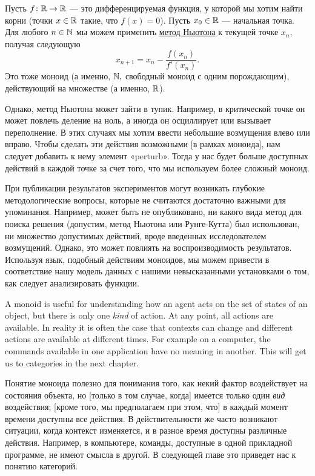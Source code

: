 \documentclass[../main/CT4S-EN-RU]{subfiles}
\begin{document}
\begin{applicationRUS}
Пусть $f\colon{\mathbb R}\rightarrow{\mathbb R}$ — это дифференцируемая функция, у которой мы хотим найти корни (точки $x\in{\mathbb R}$ такие, что $f(x)=0$). Пусть $x_0\in{\mathbb R}$ — начальная точка. Для любого $n\in{\mathbb N}$ мы можем применить \href{https://ru.wikipedia.org/wiki/%D0%9C%D0%B5%D1%82%D0%BE%D0%B4_%D0%9D%D1%8C%D1%8E%D1%82%D0%BE%D0%BD%D0%B0}{\text метод Ньютона} к текущей точке $x_n,$ получая следующую $$x_{n+1}=x_n-\frac{f(x_n)}{f'(x_n)}.$$
Это тоже моноид (а именно, ${\mathbb N},$ свободный моноид с одним порождающим), действующий на множестве (а именно, ${\mathbb R}$).

Однако, метод Ньютона может зайти в тупик. Например, в критической точке он может повлечь деление на ноль, а иногда он осциллирует или вызывает переполнение. В этих случаях мы хотим ввести небольшие возмущения влево или вправо. Чтобы сделать эти действия возможными [в рамках моноида], нам следует добавить к нему элемент «perturb». Тогда у нас будет больше доступных действий в каждой точке за счет того, что мы используем более сложный моноид.

При публикации результатов экспериментов могут возникать глубокие методологические вопросы, которые не считаются достаточно важными для упоминания. Например, может быть не опубликовано, ни какого вида метод для поиска решения (допустим, метод Ньютона или Рунге-Кутта) был использован, ни множество допустимых действий, вроде введенных исследователем возмущений. Однако, это может повлиять на воспроизводимость результатов. Используя язык, подобный действиям моноидов, мы можем привести в соответствие нашу модель данных с нашими невысказанными установками о том, как следует анализировать функции.
\end{applicationRUS}

\begin{remarkENG}
A monoid is useful for understanding how an agent acts on the set of states of an object, but there is only one {\em kind} of action. At any point, all actions are available. In reality it is often the case that contexts can change and different actions are available at different times. For example on a computer, the commands available in one application have no meaning in another. This will get us to categories in the next chapter.
\end{remarkENG}

\begin{remarkRUS}
Понятие моноида полезно для понимания того, как некий фактор воздействует на состояния объекта, но [только в том случае, когда] имеется только один {\em вид} воздействия; [кроме того, мы предполагаем при этом, что] в каждый момент времени доступны все действия. В действительности же часто возникают ситуации, когда контекст изменяется, и в разное время доступны различные действия. Например, в компьютере, команды, доступные в одной прикладной программе, не имеют смысла в другой. В следующей главе это приведет нас к понятию категорий.
\end{remarkRUS}
\end{document}
